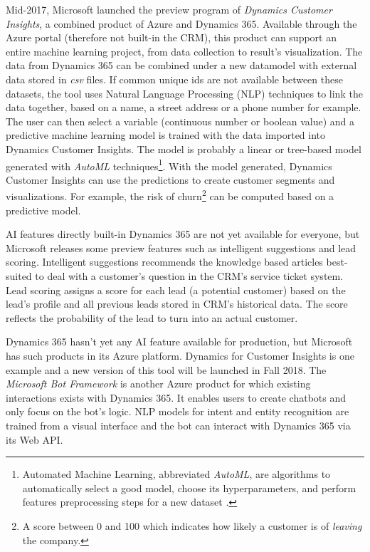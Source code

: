 Mid-2017, Microsoft launched the preview program of \textit{Dynamics Customer Insights}, a combined product of Azure and Dynamics 365. Available through the Azure portal (therefore not built-in the CRM), this product can support an entire machine learning project, from data collection to result's visualization. The data from Dynamics 365 can be combined under a new datamodel with external data stored in \textit{csv} files. If common unique ids are not available between these datasets, the tool uses Natural Language Processing (NLP) techniques to link the data together, based on a name, a street address or a phone number for example. The user can then select a variable (continuous number or boolean value) and a predictive machine learning model is trained with the data imported into Dynamics Customer Insights. The model is probably a linear or tree-based model generated with \textit{AutoML} techniques\footnote{Automated Machine Learning, abbreviated \textit{AutoML}, are algorithms to automatically select a good model, choose its hyperparameters, and perform features preprocessing steps for a new dataset \cite{NIPS2015_5872}.}. With the model generated, Dynamics Customer Insights can use the predictions to create customer segments and visualizations. For example, the risk of churn\footnote{A score between 0 and 100 which indicates how likely a customer is of \textit{leaving} the company.} can be computed based on a predictive model.

AI features directly built-in Dynamics 365 are not yet available for everyone, but Microsoft releases some preview features such as intelligent suggestions and lead scoring. Intelligent suggestions recommends the knowledge based articles best-suited to deal with a customer's question in the CRM's service ticket system. Lead scoring assigns a score for each lead (a potential customer) based on the lead's profile and all previous leads stored in CRM's historical data. The score reflects the probability of the lead to turn into an actual customer.

Dynamics 365 hasn't yet any AI feature available for production, but Microsoft has such products in its Azure platform. Dynamics for Customer Insights is one example and a new version of this tool will be launched in Fall 2018. The \textit{Microsoft Bot Framework} is another Azure product for which existing interactions exists with Dynamics 365. It enables users to create chatbots and only focus on the bot's logic. NLP models for intent and entity recognition are trained from a visual interface and the bot can interact with Dynamics 365 via its Web API.

